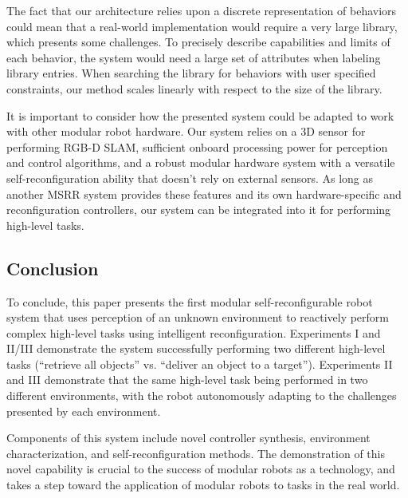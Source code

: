 \documentclass[journal]{IEEEtran}
\begin{document}
The fact that our architecture relies upon a discrete representation of behaviors could mean that a real-world implementation would require a very large library, which presents some challenges. To precisely describe capabilities and limits of each behavior, the system would need a large set of attributes when labeling library entries. 
When searching the library for behaviors with user specified constraints, our method scales linearly with respect to the size of the library.%

It is important to consider how the presented system could be adapted to work with
other modular robot hardware. Our system relies on a 3D sensor for performing RGB-D
SLAM, sufficient onboard processing power for perception and control algorithms,
and a robust modular hardware system with a versatile self-reconfiguration ability
that doesn't rely on external sensors. As long as another MSRR system provides these
features and its own hardware-specific and reconfiguration controllers, our system
can be integrated into it for performing high-level tasks.
%
\subsection{Conclusion}
%
To conclude, this paper presents the first modular self-reconfigurable robot system that uses perception of an unknown environment to reactively perform complex high-level tasks using intelligent reconfiguration. Experiments I and II/III demonstrate
the system successfully performing two different high-level tasks (``retrieve
all objects'' vs. ``deliver an object to a target''). Experiments II and
III demonstrate that the same high-level task being performed in two different
environments, with the robot autonomously adapting to the challenges presented
by each environment.

Components of this system include novel controller synthesis, environment characterization, and self-reconfiguration methods. The demonstration of this novel capability is crucial to the success of modular robots as a technology, and takes a step toward the application of modular robots to tasks in the real world.
%
%
\end{document}
